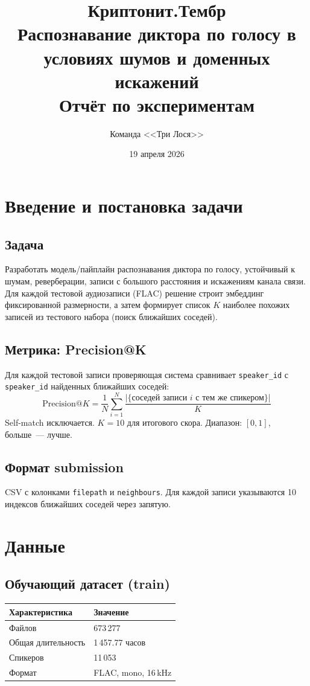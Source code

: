 \documentclass[12pt,a4paper]{article}
\title{%
  \vspace{-1cm}
  \textbf{Криптонит.Тембр}\\[0.3em]
  \large Распознавание диктора по голосу в условиях шумов и доменных искажений\\[0.5em]
  \normalsize Отчёт по экспериментам
}
\author{Команда <<Три Лося>>}
\date{19 апреля 2026}
\begin{document}
\maketitle
\tableofcontents
\newpage

\section{Введение и постановка задачи}

\subsection{Задача}

Разработать модель/пайплайн распознавания диктора по голосу, устойчивый к шумам, реверберации, записи с большого расстояния и искажениям канала связи. Для каждой тестовой аудиозаписи (FLAC) решение строит эмбеддинг фиксированной размерности, а затем формирует список $K$ наиболее похожих записей из тестового набора (поиск ближайших соседей).

\subsection{Метрика: Precision@K}

Для каждой тестовой записи проверяющая система сравнивает \texttt{speaker\_id} с \texttt{speaker\_id} найденных ближайших соседей:
\[
  \text{Precision@}K = \frac{1}{N}\sum_{i=1}^{N} \frac{|\{\text{соседей записи } i \text{ с тем же спикером}\}|}{K}
\]
Self-match исключается. $K=10$ для итогового скора. Диапазон: $[0, 1]$, больше~--- лучше.

\subsection{Формат submission}

CSV с колонками \texttt{filepath} и \texttt{neighbours}. Для каждой записи указываются 10 индексов ближайших соседей через запятую.

\section{Данные}

\subsection{Обучающий датасет (train)}

\begin{tabular}{l l}
\hline
Характеристика & Значение \\
\hline
Файлов & 673\,277 \\
Общая длительность & 1\,457.77 часов \\
Спикеров & 11\,053 \\
Формат & FLAC, mono, 16\,kHz \\
\hline
\end{tabular}
\end{document}
